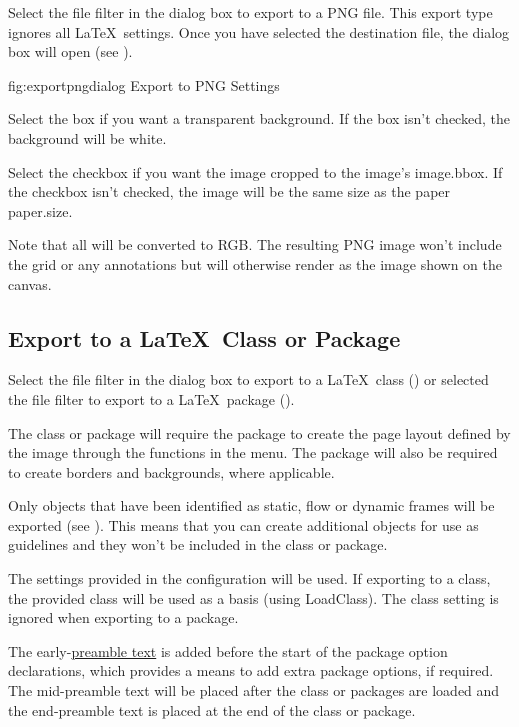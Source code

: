 Select the  file filter in the
 dialog box to export to a PNG file. This export type
ignores all \LaTeX\ settings. Once you have selected the destination
 file, the 
dialog box will open (see ).

\FloatFig
  {fig:exportpngdialog}
  {}
  {Export to PNG Settings}

Select the  box if you want a transparent
background. If the box isn't checked, the background will be white.

Select the  checkbox if you want the image cropped
to the image's \gls{image.bbox}. If the checkbox isn't checked, the image
will be the same size as the paper \gls{paper.size}. 

Note that all  will be converted to RGB.
The resulting PNG image won't include the grid or any annotations
but will otherwise render as the image shown on the \gls{canvas}.

\subsection{Export to a \LaTeX\ Class or Package}\label{sec:exportsty}

Select the  file filter in the
 dialog box to export to a \LaTeX\ class
() or selected the 
file filter to export to a \LaTeX\ package ().

The class or package will require the  package to
create the page layout defined by the image through the functions in
the  menu.  The  package will also be
required to create borders and backgrounds, where applicable.

Only \glspl{object} that have been identified as static, flow or
dynamic frames will be exported (see ).
This means that you can create additional \glspl{object} for use as
guidelines and they won't be included in the class or package.

The settings provided in the  configuration
will be used. If exporting to a class, the provided class will be
used as a basis (using \gls{LoadClass}). The class setting is
ignored when exporting to a package.

The early-\hyperref[sec:preamble]{preamble text} is added before the
start of the package option declarations, which provides a means to
add extra package options, if required.  The mid-preamble text will
be placed after the class or packages are loaded and the
end-preamble text is placed at the end of the class or package.

